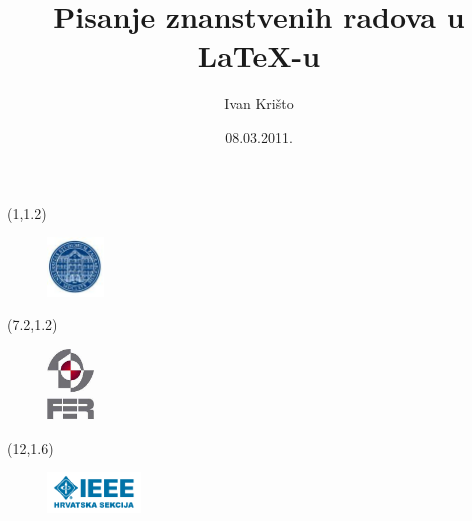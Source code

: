 \documentclass{beamer}
\title{Pisanje znanstvenih radova u \LaTeX-u}
\author{Ivan Krišto}
\institute[Universities of]
{
Fakultet Elektrotehnike i Računarstva\\
Sveučilište u Zagrebu}
\date{08.03.2011.}
\begin{document}
\begin{frame}
\begin{textblock}{7}(1,1.2)
\begin{figure}
\centering
\includegraphics[width=1.5cm]{logo-sveuciliste.jpg}
\end{figure}
\end{textblock}

\begin{textblock}{7}(7.2,1.2)
\begin{figure}
\centering
\includegraphics[width=1.25cm]{FER_logo.jpg}
\end{figure}
\end{textblock}

\begin{textblock}{7}(12,1.6)
\begin{figure}
\centering
\includegraphics[width=2.5cm]{logo-ieee.png}
\end{figure}
\end{textblock}

\vspace{70pt}
\titlepage
\end{frame}

\end{document}
